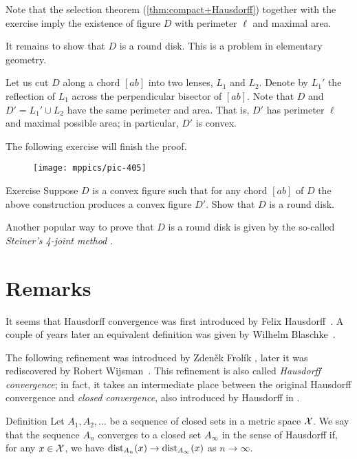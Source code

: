 Note that the selection theorem (\ref{thm:compact+Hausdorff}) together with the exercise imply the existence of figure $D$ with perimeter $\ell$ and maximal area.

It remains to show that $D$ is a round disk.
This is a problem in elementary geometry.

Let us cut $D$ along a chord $[ab]$ into two lenses, $L_1$ and $L_2$.
Denote by $L_1'$ the reflection of $L_1$ across the perpendicular bisector of $[ab]$.
Note that $D$ and $D'=L_1'\cup L_2$ have the same perimeter and area.
That is, $D'$ has perimeter $\ell$ and maximal possible area;
in particular, $D'$ is convex.

The following exercise will finish the proof.
\qeds

{

\begin{wrapfigure}{o}{57 mm}
\vskip-5mm
\centering
\texttt{[image: mppics/pic-405]}
\end{wrapfigure}

\begin{thm}{Exercise}\label{ex:round-disc}
Suppose $D$ is a convex figure such that for any chord $[ab]$ of $D$ the above construction produces a convex figure $D'$.
Show that $D$ is a round disk.
\end{thm}


}

Another popular way to prove that $D$ is a round disk is given by the so-called {}\emph{Steiner's 4-joint method} \cite{blaschke}.

\section{Remarks}\label{sec:H-variation}

It seems that Hausdorff convergence was first introduced by Felix Hausdorff~\cite{hausdorff}.
A couple of years later an equivalent definition was given by Wilhelm Blaschke~\cite{blaschke}.

The following refinement was introduced by  Zdeněk Frolík \cite{frolik},
later it was rediscovered by Robert Wijsman~\cite{wijsman}.  
This refinement is also called \emph{Hausdorff convergence};
in fact, it takes an intermediate place between the original Hausdorff convergence and {}\emph{closed convergence}, also introduced by Hausdorff in \cite{hausdorff}.

\begin{thm}{Definition}\label{def:gen-Haus-conv}
Let $A_1,A_2,\dots$ be a sequence of closed sets in a metric space $\mathcal{X}$.
We say that the sequence $A_n$ converges to a closed set $A_\infty$ in the sense of Hausdorff if, for any $x\in\mathcal{X}$, we have
$\distfun_{A_n}(x)\z\to \distfun_{A_\infty}(x)$ as $n\to\infty$.
\end{thm}

